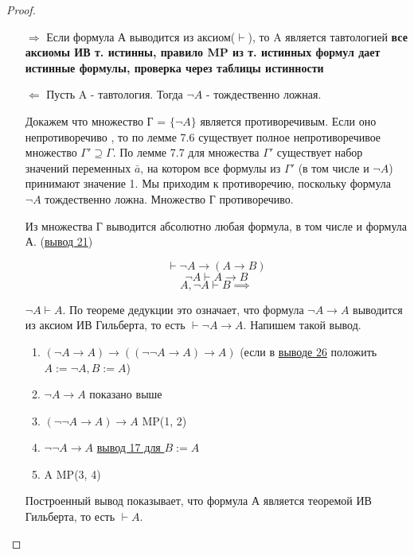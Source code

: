 \documentclass[a4paper]{article}
\theoremstyle{definition}
\theoremstyle{remark}
\begin{document}
	\begin{proof}
        \begin{itemize}
            \item[$\Rightarrow$] Если формула А выводится из аксиом($\vdash$), то A является тавтологией
            \textbf{все аксиомы ИВ т. истинны, правило MP из т. истинных формул дает истинные формулы, проверка через таблицы истинности}
            \item[$\Leftarrow$] Пусть A - тавтология. Тогда $\neg{A}$ - тождественно ложная. 
            
            Докажем что множество Г = $\{\neg{A}\}$ является противоречивым. Если оно непротиворечиво , то по 
            лемме 7.6 существует полное непротиворечивое множество $\Gamma' \supseteq \Gamma$. 
            По лемме 7.7 для множества ${\Gamma}'$ существует набор значений переменных $\bar{a}$, на котором 
            все формулы из $\Gamma'$ (в том числе и $\neg A$) принимают значение 1. Мы приходим к противоречию, 
            поскольку формула $\neg A$ тождественно ложна.
            Множество Г противоречиво. 
            
            Из множества Г выводится абсолютно любая формула, в том числе и формула А. (\hyperlink{Вывод 21}{вывод 21})

            $$\vdash \neg A \to (A \to B)$$
            $$\neg A \vdash A \to B$$
            $$A, \neg A \vdash B\implies$$

            $\neg A \vdash A$. По теореме дедукции это означает, что формула $\neg A \rightarrow A$ выводится из аксиом ИВ Гильберта, то есть $\vdash \neg A \rightarrow A$. Напишем такой вывод.
            \begin{enumerate}
                \item $(\neg A \rightarrow A) \rightarrow ((\neg\neg A \rightarrow A) \rightarrow A)$ (если в \hyperlink{Вывод 26}{выводе 26} положить $A:=\neg A, B :=A$)
                \item $\neg A \rightarrow A$ показано выше
                \item $(\neg\neg A \rightarrow A) \rightarrow A$ MP(1, 2)
                \item $\neg\neg A \rightarrow A$ \hyperlink{Вывод 17}{вывод 17 для $B:= A$}
                \item A MP(3, 4)
            \end{enumerate}
    
            Построенный вывод показывает, что формула А является теоремой ИВ Гильберта, то есть $\vdash A$. 
       
        \end{itemize}
		 \end{proof}
\end{document}
